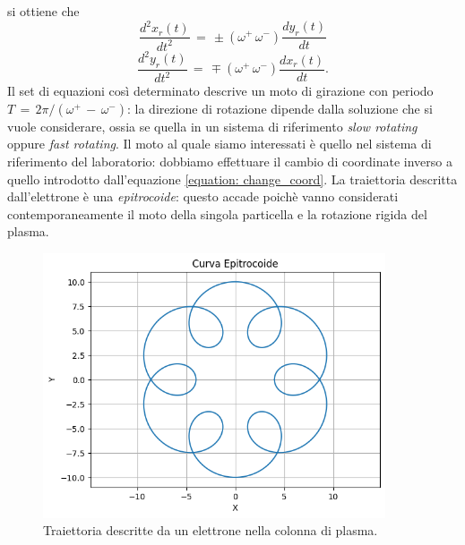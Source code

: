 si ottiene che 
\begin{equation}
    \frac{d^2x_r\left(t\right)}{dt^2}\,=\,\pm \left(\omega^+\,\omega^-\right)\frac{dy_r\left(t\right)}{dt}
    \label{equation: xcomp_singlepart1}
\end{equation}
\begin{equation}
    \frac{d^2y_r\left(t\right)}{dt^2}\,=\,\mp \left(\omega^+\,\omega^-\right)\frac{dx_r\left(t\right)}{dt}.
    \label{equation: ycomp_singlepart1}
\end{equation}
Il set di equazioni così determinato descrive un moto di girazione con periodo $T\,=\,2\pi/\left(\omega^+\,-\,\omega^-\right)$: la 
direzione di rotazione dipende dalla soluzione che si vuole considerare, ossia se quella in un sistema di riferimento \textit{slow rotating} 
oppure \textit{fast rotating}. Il moto al quale siamo interessati è quello nel sistema di riferimento del laboratorio: dobbiamo 
effettuare il cambio di coordinate inverso a quello introdotto dall'equazione \eqref{equation: change_coord}. La traiettoria 
descritta dall'elettrone è una \textit{epitrocoide}: questo accade poichè vanno considerati contemporaneamente il moto della singola 
particella e la rotazione rigida del plasma.
\begin{figure}[H]
    \centering
    \includegraphics[width=0.9\textwidth]{Immagini/CurvaEpitrocoide.png}
    \caption{Traiettoria descritte da un elettrone nella colonna di plasma. }
    \label{figure: CurvaEpitrocoide}
\end{figure}
